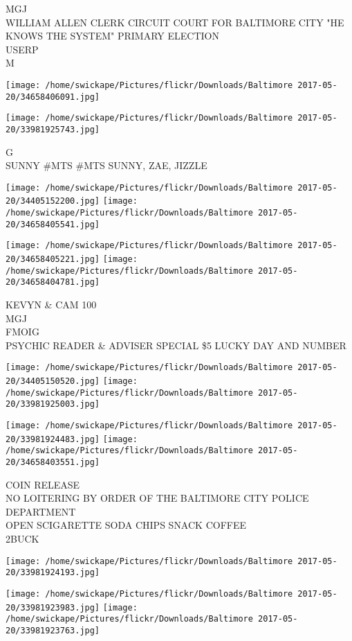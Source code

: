 \documentclass[10pt,letterpaper]{article}
\begin{document}
MGJ\\
WILLIAM ALLEN CLERK CIRCUIT COURT FOR BALTIMORE CITY "HE KNOWS THE SYSTEM" PRIMARY ELECTION\\
USERP\\
M
\pagebreak

\texttt{[image: /home/swickape/Pictures/flickr/Downloads/Baltimore 2017-05-20/34658406091.jpg]}

\vspace{0.25in}
\texttt{[image: /home/swickape/Pictures/flickr/Downloads/Baltimore 2017-05-20/33981925743.jpg]}

G\\
SUNNY \#MTS \#MTS SUNNY, ZAE, JIZZLE
\pagebreak

\texttt{[image: /home/swickape/Pictures/flickr/Downloads/Baltimore 2017-05-20/34405152200.jpg]}
\texttt{[image: /home/swickape/Pictures/flickr/Downloads/Baltimore 2017-05-20/34658405541.jpg]}

\texttt{[image: /home/swickape/Pictures/flickr/Downloads/Baltimore 2017-05-20/34658405221.jpg]}
\texttt{[image: /home/swickape/Pictures/flickr/Downloads/Baltimore 2017-05-20/34658404781.jpg]}

KEVYN \& CAM 100\\
MGJ\\
FMOIG\\
PSYCHIC READER \& ADVISER SPECIAL \$5 LUCKY DAY AND NUMBER
\pagebreak

\texttt{[image: /home/swickape/Pictures/flickr/Downloads/Baltimore 2017-05-20/34405150520.jpg]}
\texttt{[image: /home/swickape/Pictures/flickr/Downloads/Baltimore 2017-05-20/33981925003.jpg]}

\texttt{[image: /home/swickape/Pictures/flickr/Downloads/Baltimore 2017-05-20/33981924483.jpg]}
\texttt{[image: /home/swickape/Pictures/flickr/Downloads/Baltimore 2017-05-20/34658403551.jpg]}

COIN RELEASE\\
NO LOITERING BY ORDER OF THE BALTIMORE CITY POLICE DEPARTMENT\\
OPEN SCIGARETTE SODA CHIPS SNACK COFFEE\\
2BUCK
\pagebreak

\texttt{[image: /home/swickape/Pictures/flickr/Downloads/Baltimore 2017-05-20/33981924193.jpg]}

\vspace{0.25in}
\texttt{[image: /home/swickape/Pictures/flickr/Downloads/Baltimore 2017-05-20/33981923983.jpg]}
\texttt{[image: /home/swickape/Pictures/flickr/Downloads/Baltimore 2017-05-20/33981923763.jpg]}
\end{document}

